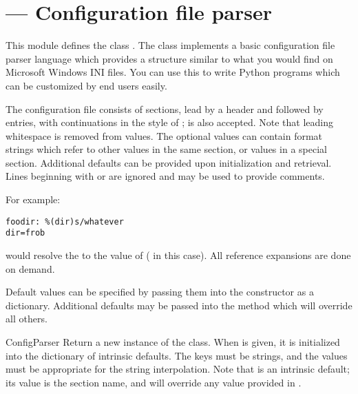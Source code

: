 \section{ ---
         Configuration file parser}


This module defines the class .
The  class implements a basic configuration file
parser language which provides a structure similar to what you would
find on Microsoft Windows INI files.  You can use this to write Python
programs which can be customized by end users easily.

The configuration file consists of sections, lead by a
\samp{[section]} header and followed by  entries,
with continuations in the style of ;  is
also accepted.  Note that leading whitespace is removed from values.
The optional values can contain format strings which refer to other
values in the same section, or values in a special
 section.  Additional defaults can be provided upon
initialization and retrieval.  Lines beginning with \character{\#} or
\character{;} are ignored and may be used to provide comments.

For example:

\begin{verbatim}
foodir: %(dir)s/whatever
dir=frob
\end{verbatim}

would resolve the  to the value of
 ( in this case).  All reference expansions are
done on demand.

Default values can be specified by passing them into the
 constructor as a dictionary.  Additional defaults 
may be passed into the  method which will override all
others.

\begin{classdesc}{ConfigParser}{}
Return a new instance of the  class.  When
 is given, it is initialized into the dictionary of
intrinsic defaults.  The keys must be strings, and the values must be 
appropriate for the  string interpolation.  Note that
 is an intrinsic default; its value is the section name,
and will override any value provided in .
\end{classdesc}

